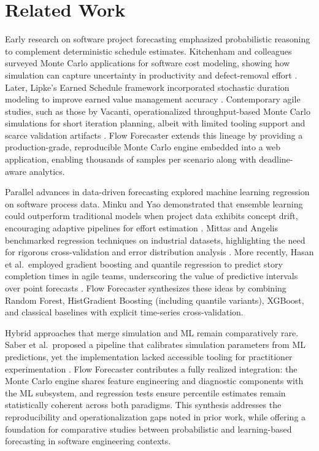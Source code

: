 \section{Related Work}
Early research on software project forecasting emphasized probabilistic reasoning to complement deterministic schedule estimates. Kitchenham and colleagues surveyed Monte Carlo applications for software cost modeling, showing how simulation can capture uncertainty in productivity and defect-removal effort \cite{Kitchenham2002}. Later, Lipke's Earned Schedule framework incorporated stochastic duration modeling to improve earned value management accuracy \cite{Lipke2009}. Contemporary agile studies, such as those by Vacanti, operationalized throughput-based Monte Carlo simulations for short iteration planning, albeit with limited tooling support and scarce validation artifacts \cite{Vacanti2018}. Flow Forecaster extends this lineage by providing a production-grade, reproducible Monte Carlo engine embedded into a web application, enabling thousands of samples per scenario along with deadline-aware analytics.

Parallel advances in data-driven forecasting explored machine learning regression on software process data. Minku and Yao demonstrated that ensemble learning could outperform traditional models when project data exhibits concept drift, encouraging adaptive pipelines for effort estimation \cite{Minku2012}. Mittas and Angelis benchmarked regression techniques on industrial datasets, highlighting the need for rigorous cross-validation and error distribution analysis \cite{Mittas2013}. More recently, Hasan et al.\ employed gradient boosting and quantile regression to predict story completion times in agile teams, underscoring the value of predictive intervals over point forecasts \cite{Hasan2021}. Flow Forecaster synthesizes these ideas by combining Random Forest, HistGradient Boosting (including quantile variants), XGBoost, and classical baselines with explicit time-series cross-validation.

Hybrid approaches that merge simulation and ML remain comparatively rare. Saber et al.\ proposed a pipeline that calibrates simulation parameters from ML predictions, yet the implementation lacked accessible tooling for practitioner experimentation \cite{Saber2019}. Flow Forecaster contributes a fully realized integration: the Monte Carlo engine shares feature engineering and diagnostic components with the ML subsystem, and regression tests ensure percentile estimates remain statistically coherent across both paradigms. This synthesis addresses the reproducibility and operationalization gaps noted in prior work, while offering a foundation for comparative studies between probabilistic and learning-based forecasting in software engineering contexts.
